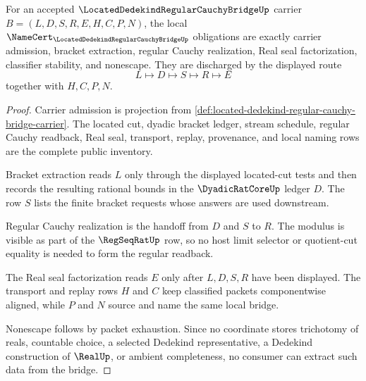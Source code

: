 \begin{theorem}
\label{thm:located-dedekind-regular-cauchy-bridge-namecert-obligations}
For an accepted $\LocatedDedekindRegularCauchyBridgeUp$ carrier $B=(L,D,S,R,E,H,C,P,N)$, the local $\NameCert_{\LocatedDedekindRegularCauchyBridgeUp}$ obligations are exactly carrier admission, bracket extraction, regular Cauchy realization, Real seal factorization, classifier stability, and nonescape. They are discharged by the displayed route
$$
L\longmapsto D\longmapsto S\longmapsto R\longmapsto E
$$
together with $H,C,P,N$.
\end{theorem}
\begin{proof}
Carrier admission is projection from \autoref{def:located-dedekind-regular-cauchy-bridge-carrier}. The located cut, dyadic bracket ledger, stream schedule, regular Cauchy readback, Real seal, transport, replay, provenance, and local naming rows are the complete public inventory.

Bracket extraction reads $L$ only through the displayed located-cut tests and then records the resulting rational bounds in the $\DyadicRatCoreUp$ ledger $D$. The row $S$ lists the finite bracket requests whose answers are used downstream.

Regular Cauchy realization is the handoff from $D$ and $S$ to $R$. The modulus is visible as part of the $\RegSeqRatUp$ row, so no host limit selector or quotient-cut equality is needed to form the regular readback.

The Real seal factorization reads $E$ only after $L,D,S,R$ have been displayed. The transport and replay rows $H$ and $C$ keep classified packets componentwise aligned, while $P$ and $N$ source and name the same local bridge.

Nonescape follows by packet exhaustion. Since no coordinate stores trichotomy of reals, countable choice, a selected Dedekind representative, a Dedekind construction of $\RealUp$, or ambient completeness, no consumer can extract such data from the bridge.
\end{proof}



